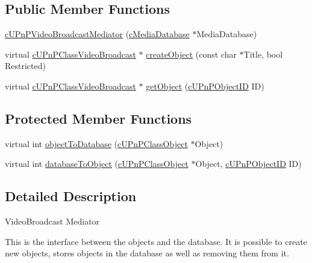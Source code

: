 \subsection*{Public Member Functions}
\begin{CompactItemize}
\item 
\hyperlink{classcUPnPVideoBroadcastMediator_58179b50ee5a5952cff70aa4473845f9}{cUPnPVideoBroadcastMediator} (\hyperlink{classcMediaDatabase}{cMediaDatabase} $\ast$MediaDatabase)
\item 
virtual \hyperlink{classcUPnPClassVideoBroadcast}{cUPnPClassVideoBroadcast} $\ast$ \hyperlink{classcUPnPVideoBroadcastMediator_14fefa90807d40d91a80712729af2beb}{createObject} (const char $\ast$Title, bool Restricted)
\item 
virtual \hyperlink{classcUPnPClassVideoBroadcast}{cUPnPClassVideoBroadcast} $\ast$ \hyperlink{classcUPnPVideoBroadcastMediator_c13bf0f008f49b0ab499542391998a24}{getObject} (\hyperlink{structcUPnPObjectID}{cUPnPObjectID} ID)
\end{CompactItemize}
\subsection*{Protected Member Functions}
\begin{CompactItemize}
\item 
virtual int \hyperlink{classcUPnPVideoBroadcastMediator_822f9c93928a7dbe9491c8cccbf53f95}{objectToDatabase} (\hyperlink{classcUPnPClassObject}{cUPnPClassObject} $\ast$Object)
\item 
virtual int \hyperlink{classcUPnPVideoBroadcastMediator_33237e5d850c107d37be37c1646b17d7}{databaseToObject} (\hyperlink{classcUPnPClassObject}{cUPnPClassObject} $\ast$Object, \hyperlink{structcUPnPObjectID}{cUPnPObjectID} ID)
\end{CompactItemize}


\subsection{Detailed Description}
VideoBroadcast Mediator

This is the interface between the objects and the database. It is possible to create new objects, stores objects in the database as well as removing them from it. 

